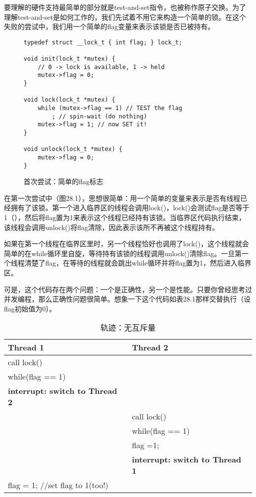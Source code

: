 要理解的硬件支持最简单的部分就是test-and-set指令，也被称作原子交换。为了理解test-and-set是如何工作的，我们先试着不用它来构造一个简单的锁。在这个失败的尝试中，我们用一个简单的flag变量来表示该锁是否已被持有。

\begin{figure}[h]
\begin{lstlisting}
typedef struct __lock_t { int flag; } lock_t;

void init(lock_t *mutex) {
    // 0 -> lock is available, 1 -> held
    mutex->flag = 0;
}

void lock(lock_t *mutex) {
    while (mutex->flag == 1) // TEST the flag
        ; // spin-wait (do nothing)
    mutex->flag = 1; // now SET it!
}

void unlock(lock_t *mutex) {
    mutex->flag = 0;
}
\end{lstlisting}
\caption{首次尝试：简单的flag标志}
\end{figure}

在第一次尝试中（图28.1），思想很简单：用一个简单的变量来表示是否有线程已经拥有了该锁。第一个进入临界区的线程会调用lock()，lock()会测试flag是否等于1（），然后将flag置为1来表示这个线程已经持有该锁。当临界区代码执行结束，该线程会调用unlock()将flag清除，因此表示该所不再被这个线程持有。

如果在第一个线程在临界区里时，另一个线程恰好也调用了lock()，这个线程就会简单的在while循环里自旋，等待持有该锁的线程调用unlock()清除flag。一旦第一个线程清楚了flag，在等待的线程就会跳出while循环并将flag置为1，然后进入临界区。

可是，这个代码存在两个问题：一个是正确性，另一个是性能。只要你曾经思考过并发编程，那么正确性问题很简单。想象一下这个代码如表28.1那样交替执行（设flag初始值为0）。

\begin{table}[h]
\centering
{\scriptsize
\begin{tabular}{p{4cm} p{4cm}}
\textbf{Thread 1}&\textbf{Thread 2}\\ \midrule[1.1pt]
call lock() & \\
while(flag == 1) & \\
\textbf{interrupt: switch to Thread 2} &  \\
  & call lock() \\
  & while(flag == 1) \\
  & flag =1; \\
  & \textbf{interrupt: switch to Thread 1}  \\
 flag = 1; //set flag to 1(too!) &  \\
\end{tabular}}
\caption{\footnotesize 轨迹：无互斥量}\color{black}\label{tab26-1}
\end{table}

